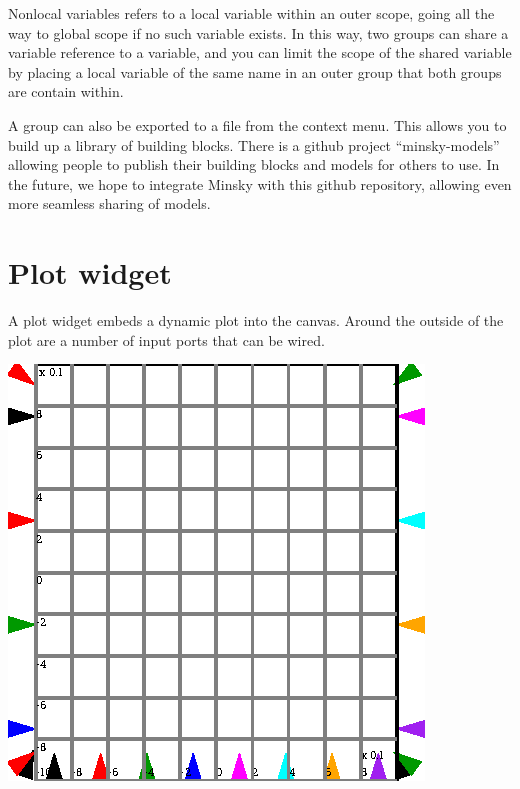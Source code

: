 Nonlocal variables refers to a local variable within an outer scope,
going all the way to global scope if no such variable exists. In this
way, two groups can share a variable reference to a variable, and you
can limit the scope of the shared variable by placing a local variable
of the same name in an outer group that both groups are contain
within.

A group can also be exported to a file from the context menu.  This
allows you to build up a library of building blocks. There is a github
project ``minsky-models'' allowing people to publish their building
blocks and models for others to use. In the future, we hope to
integrate Minsky with this github repository, allowing even more
seamless sharing of models.

\section{Plot widget}
\label{PlotWidget}

A plot widget embeds a dynamic plot into the canvas. Around the
outside of the plot are a number of input ports that can be wired.

\begin{center}
  \includegraphics{images/plotWidget.eps}
\end{center}


